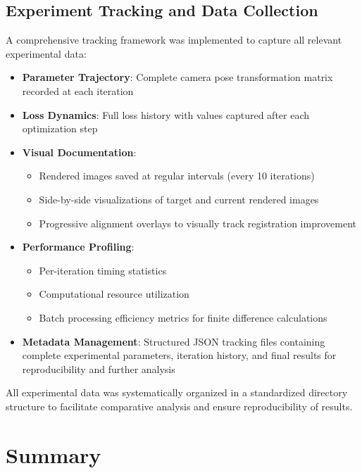 \subsection{Experiment Tracking and Data Collection}

A comprehensive tracking framework was implemented to capture all relevant experimental data:

\begin{itemize}
    \item \textbf{Parameter Trajectory}: Complete camera pose transformation matrix recorded at each iteration
    
    \item \textbf{Loss Dynamics}: Full loss history with values captured after each optimization step
    
    \item \textbf{Visual Documentation}: 
    \begin{itemize}
        \item Rendered images saved at regular intervals (every 10 iterations)
        \item Side-by-side visualizations of target and current rendered images
        \item Progressive alignment overlays to visually track registration improvement
    \end{itemize}
    
    \item \textbf{Performance Profiling}:
    \begin{itemize}
        \item Per-iteration timing statistics
        \item Computational resource utilization
        \item Batch processing efficiency metrics for finite difference calculations
    \end{itemize}
    
    \item \textbf{Metadata Management}: Structured JSON tracking files containing complete experimental parameters, iteration history, and final results for reproducibility and further analysis
\end{itemize}

All experimental data was systematically organized in a standardized directory structure to facilitate comparative analysis and ensure reproducibility of results.

\section{Summary}


